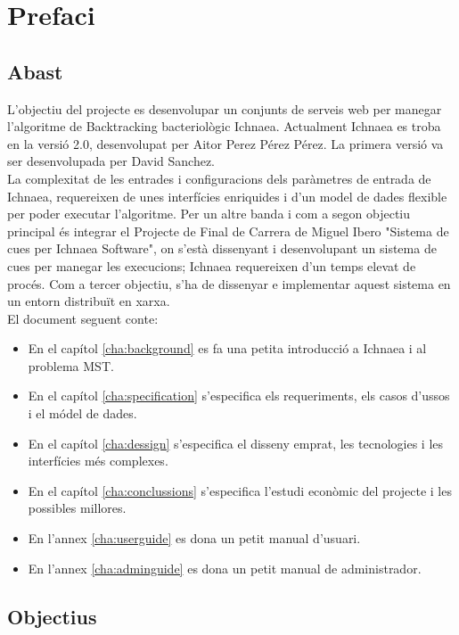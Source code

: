 \chapter{Prefaci}
\label{cha:prefaci}


\section{Abast}
\label{sec:abast}

L'objectiu del projecte es desenvolupar un conjunts de serveis web per manegar l'algoritme de Backtracking bacteriol\`{o}gic Ichnaea. Actualment Ichnaea es troba en la versi\'{o} 2.0, desenvolupat per Aitor Perez P\'{e}rez P\'{e}rez. La primera versi\'{o} va ser desenvolupada per David Sanchez. \\

La complexitat de les entrades i configuracions dels paràmetres de entrada de Ichnaea, requereixen de unes interfícies enriquides i d'un model de dades flexible per poder executar l'algoritme. Per un altre banda i com a segon objectiu principal \'{e}s integrar el Projecte de Final de Carrera de Miguel Ibero "Sistema de cues per Ichnaea Software", on s'est\`{a} dissenyant i desenvolupant un sistema de cues per manegar les execucions; Ichnaea requereixen d'un temps elevat de proc\'{e}s. Com a tercer objectiu, s'ha de dissenyar e implementar aquest sistema en un entorn distribuït en xarxa. \\

El document seguent conte:
\begin{itemize}
\item En el cap\'{i}tol \ref{cha:background} es fa una petita introducci\'{o} a Ichnaea i al problema MST. 
\item En el cap\'{i}tol \ref{cha:specification} s'especifica els requeriments, els casos d'ussos i el m\'{o}del de dades.
\item En el cap\'{i}tol \ref{cha:dessign} s'especifica el disseny emprat, les tecnologies i les interf\'{i}cies m\'e{s} complexes.
\item En el cap\'{i}tol \ref{cha:conclussions} s'especifica l'estudi econ\`{o}mic del projecte i les possibles millores.
\item En l'annex \ref{cha:userguide} es dona un petit manual d'usuari.
\item En l'annex \ref{cha:adminguide} es dona un petit manual de administrador.
\end{itemize}

\section{Objectius}
\label{sec:objetius}

